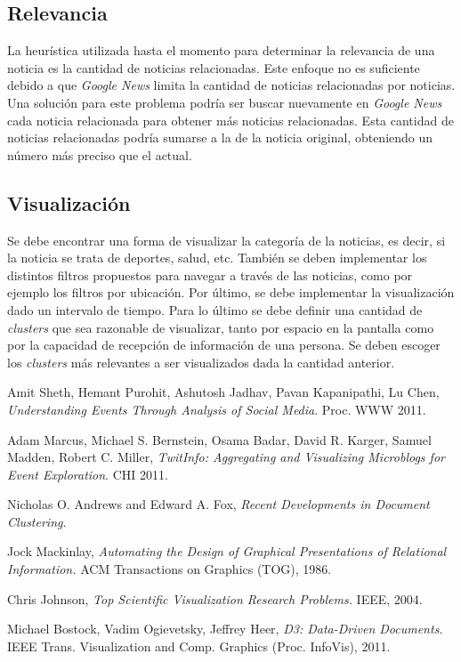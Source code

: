 \documentclass[10pt]{article}
\begin{document}
\subsection{Relevancia}

	La heurística utilizada hasta el momento para determinar la relevancia de una noticia es la cantidad de noticias relacionadas. Este enfoque no es suficiente debido a que \emph{Google News} limita la cantidad de noticias relacionadas por noticias. Una solución para este problema podría ser buscar nuevamente en \emph{Google News} cada noticia relacionada para obtener más noticias relacionadas. Esta cantidad de noticias relacionadas podría sumarse a la de la noticia original, obteniendo un número más preciso que el actual.

\subsection{Visualización}

	Se debe encontrar una forma de visualizar la categoría de la noticias, es decir, si la noticia se trata de deportes, salud, etc. También se deben implementar los distintos filtros propuestos para navegar a través de las noticias, como por ejemplo los filtros por ubicación. Por último, se debe implementar la visualización dado un intervalo de tiempo. Para lo último se debe definir una cantidad de \emph{clusters} que sea razonable de visualizar, tanto por espacio en la pantalla como por la capacidad de recepción de información de una persona. Se deben escoger los \emph{clusters} más relevantes a ser visualizados dada la cantidad anterior.

\newpage


\begin{thebibliography}{9}

Amit Sheth, Hemant Purohit, Ashutosh Jadhav, Pavan Kapanipathi, Lu Chen,
\emph{Understanding Events Through Analysis of Social Media}.
Proc. WWW 2011.

Adam Marcus, Michael S. Bernstein, Osama Badar, David R. Karger, Samuel Madden, Robert C. Miller,
\emph{TwitInfo: Aggregating and Visualizing Microblogs for Event Exploration}.
CHI 2011.

Nicholas O. Andrews and Edward A. Fox,
\emph{Recent Developments in Document Clustering}.

Jock Mackinlay,
\emph{Automating the Design of Graphical Presentations of Relational Information.}
ACM Transactions on Graphics (TOG), 1986.

Chris Johnson,
\emph{Top Scientific Visualization Research Problems.}
IEEE, 2004.

Michael Bostock, Vadim Ogievetsky, Jeffrey Heer,
\emph{D3: Data-Driven Documents.}
IEEE Trans. Visualization and Comp. Graphics (Proc. InfoVis), 2011.

\end{thebibliography}
\end{document}
